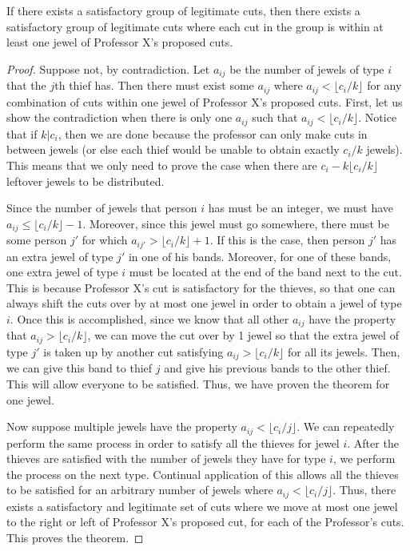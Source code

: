 \documentclass{6046}
\begin{document}
\begin{theorem}
If there exists a satisfactory group of legitimate cuts, then there exists a satisfactory group of legitimate cuts where each cut in the group is within at least one jewel of Professor X's proposed cuts. 
\end{theorem}

\begin{proof}
Suppose not, by contradiction. Let $a_{ij}$ be the number of jewels of type $i$ that the $j$th thief has. Then there must exist some $a_{ij}$ where $a_{ij} < \lfloor c_i / k \rfloor$ for any combination of cuts within one jewel of Professor X's proposed cuts. First, let us show the contradiction when there is only one $a_{ij}$ such that $a_{ij} < \lfloor c_i / k \rfloor$. Notice that if $k | c_i$, then we are done because the professor can only make cuts in between jewels (or else each thief would be unable to obtain exactly $c_i / k$ jewels). This means that we only need to prove the case when there are $c_i - k \lfloor c_i / k \rfloor$ leftover jewels to be distributed. 

Since the number of jewels that person $i$ has must be an integer, we must have $a_{ij} \leq \lfloor c_i / k \rfloor - 1$. Moreover, since this jewel must go somewhere, there must be some person $j'$ for which $a_{i j'} > \lfloor c_i / k \rfloor + 1$. If this is the case, then person $j'$ has an extra jewel of type $j'$ in one of his bands. Moreover, for one of these bands, one extra jewel of type $i$ must be located at the end of the band next to the cut. This is because Professor X's cut is satisfactory for the thieves, so that one can always shift the cuts over by at most one jewel in order to obtain a jewel of type $i$. Once this is accomplished, since we know that all other $a_{ij}$ have the property that $a_{ij} > \lfloor c_i / k \rfloor$, we can move the cut over by 1 jewel so that the extra jewel of type $j'$ is taken up by another cut satisfying $a_{ij} > \lfloor c_i / k \rfloor$ for all its jewels. Then, we can give this band to thief $j$ and give his previous bands to the other thief. This will allow everyone to be satisfied. Thus, we have proven the theorem for one jewel.

Now suppose multiple jewels have the property $a_{ij} < \lfloor c_i / j \rfloor$. We can repeatedly perform the same process in order to satisfy all the thieves for jewel $i$. After the thieves are satisfied with the number of jewels they have for type $i$, we perform the process on the next type. Continual application of this allows all the thieves to be satisfied for an arbitrary number of jewels where $a_{ij} < \lfloor c_i / j \rfloor $. Thus, there exists a satisfactory and legitimate set of cuts where we move at most one jewel to the right or left of Professor X's proposed cut, for each of the Professor's cuts. This proves the theorem.
\end{proof}
\end{document}
